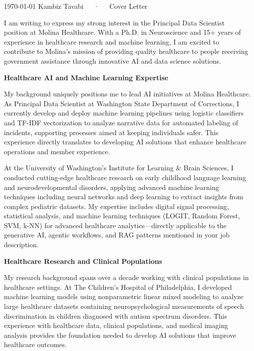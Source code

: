 \documentclass[10.5pt, letterpaper]{russell}
\begin{document}
\makecvheader[R]

\makecvfooter
{\today}
{Kambiz Tavabi~~~·~~~Cover Letter}
{\thepage}

\makelettertitle

\begin{cvletter}
  I am writing to express my strong interest in the Principal Data Scientist position at Molina Healthcare. With a Ph.D. in Neuroscience and 15+ years of experience in healthcare research and machine learning, I am excited to contribute to Molina's mission of providing quality healthcare to people receiving government assistance through innovative AI and data science solutions.

  \textbf{Healthcare AI and Machine Learning Expertise}

  My background uniquely positions me to lead AI initiatives at Molina Healthcare. As Principal Data Scientist at Washington State Department of Corrections, I currently develop and deploy machine learning pipelines using logistic classifiers and TF-IDF vectorization to analyze narrative data for automated labeling of incidents, supporting processes aimed at keeping individuals safer. This experience directly translates to developing AI solutions that enhance healthcare operations and member experience.

  At the University of Washington's Institute for Learning \& Brain Sciences, I conducted cutting-edge healthcare research on early childhood language learning and neurodevelopmental disorders, applying advanced machine learning techniques including neural networks and deep learning to extract insights from complex pediatric datasets. My expertise includes digital signal processing, statistical analysis, and machine learning techniques (LOGIT, Random Forest, SVM, k-NN) for advanced healthcare analytics—directly applicable to the generative AI, agentic workflows, and RAG patterns mentioned in your job description.

  \textbf{Healthcare Research and Clinical Populations}

  My research background spans over a decade working with clinical populations in healthcare settings. At The Children's Hospital of Philadelphia, I developed machine learning models using nonparametric linear mixed modeling to analyze large healthcare datasets containing neuropsychological measurements of speech discrimination in children diagnosed with autism spectrum disorders. This experience with healthcare data, clinical populations, and medical imaging analysis provides the foundation needed to develop AI solutions that improve healthcare outcomes.


\end{cvletter}
\end{document}
